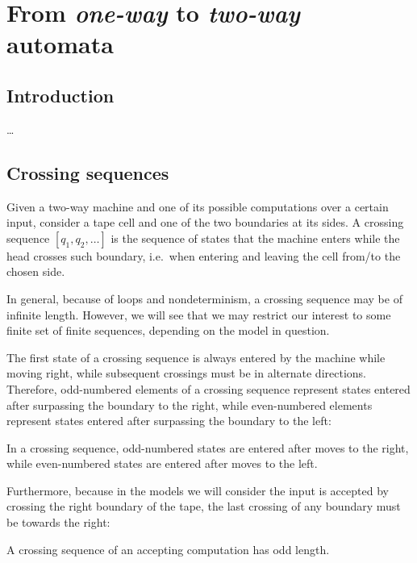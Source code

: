 \chapter{From \emph{one-way} to \emph{two-way} automata}



\section{Introduction}
\dots



\section{Crossing sequences}
Given a two-way machine and one of its possible computations over a certain input, consider a tape cell and one of the two boundaries at its sides.
A crossing sequence $[q_1,q_2,\dots]$ is the sequence of states that the machine enters while the head crosses such boundary, i.e.\ when entering and leaving the cell from/to the chosen side.

In general, because of loops and nondeterminism, a crossing sequence may be of infinite length.
However, we will see that we may restrict our interest to some finite set of finite sequences, depending on the model in question.

The first state of a crossing sequence is always entered by the machine while moving right, while subsequent crossings must be in alternate directions.
Therefore, odd-numbered elements of a crossing sequence represent states entered after surpassing the boundary to the right, while even-numbered elements represent states entered after surpassing the boundary to the left:
\begin{fact}\label{fact:crossing-parity}
	In a crossing sequence, odd-numbered states are entered after moves to the right, while even-numbered states are entered after moves to the left.
\end{fact}

Furthermore, because in the models we will consider the input is accepted by crossing the right boundary of the tape, the last crossing of any boundary must be towards the right:
\begin{fact}\label{fact:crossing-length}
	A crossing sequence of an accepting computation has odd length.
\end{fact}


